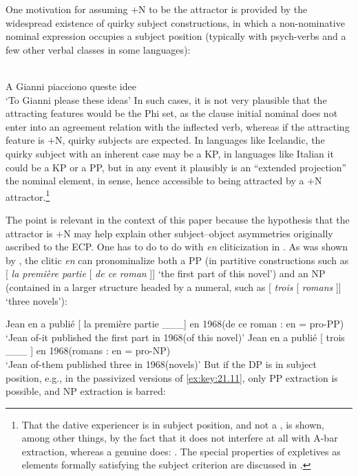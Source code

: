 \documentclass[output=paper]{langsci/langscibook}
\begin{document}
\begin{exe}
One motivation for assuming $+$N to be the attractor is provided by the
widespread existence of quirky subject constructions, in which a non-nominative
nominal expression occupies a subject position (typically with psych-verbs and
a few other verbal classes in some languages):

\ea%
    \label{ex:key:21.10}\\
    A Gianni    piacciono   queste idee\\
    ‘To Gianni  please        these ideas’
\z
%
In such cases, it is not very plausible that the attracting features would be
the Phi set, as the clause initial nominal does not enter into an agreement
relation with the inflected verb, whereas if the attracting feature is $+$N,
quirky subjects are expected. In languages like Icelandic, the quirky subject
with an inherent case may be a KP, in languages like
Italian it could be a KP or a PP, but in any event it plausibly is an “extended
projection” the nominal element, in  sense, hence
accessible to being attracted by a $+$N attractor.\footnote{That the
    dative experiencer is in subject position, and not a
    , is shown, among other things, by the fact that it does not
    interfere at all with A-bar extraction, whereas a genuine  does:
    \citealt{Calabrese1986,BellettiRizzi1988}. The special properties of
    expletives as elements formally satisfying the subject criterion are
    discussed in \citet{RizziShlonsky2007}.}

The point is relevant in the context of this paper because the hypothesis that
the attractor is $+$N may help explain other subject--object asymmetries
originally ascribed to the ECP.  One has to do to do with \emph{en}
cliticization in . As was shown by \citet{Ruwet1972}, the clitic
\emph{en} can pronominalize both a PP (in partitive constructions such as [
\emph{la première partie} [ \emph{de ce roman} ]] ‘the first part of
this novel’) and an NP (contained in a larger structure headed by a numeral,
such as [ \emph{trois} [ \emph{romans} ]] ‘three novels’):

\ea%
    \label{ex:key:21.11}
    \ea Jean  en a publié [ la première partie \_\_\_] en 1968\hfill (de ce roman : en = pro-PP)\\
        ‘Jean of-it published the first part in 1968\hfill (of this novel)’
    \ex Jean  en a publié [ trois \_\_\_ ] en 1968\hfill (romans : en = pro-NP)\\
        ‘Jean of-them published three in 1968\hfill (novels)’
    \z
\z
%
But if the DP is in subject position, e.g., in the passivized versions of
\eqref{ex:key:21.11}, only PP extraction is possible, and NP extraction is
barred:


\end{exe}
\end{document}
